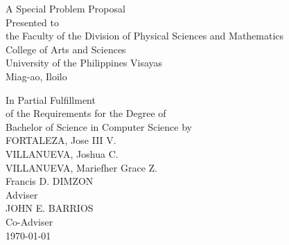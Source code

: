 \begin{titlepage}
\centering


\vspace{1cm}
A Special Problem Proposal\\
Presented to\\
the Faculty of the Division of Physical Sciences and Mathematics\\
College of Arts and Sciences\\
University of the Philippines Visayas\\
Miag-ao, Iloilo

\vspace{1cm}
In Partial Fulfillment\\
of the Requirements for the Degree of\\
Bachelor of Science in Computer Science
\vspace{1cm}
by\\

\vspace{1cm}
FORTALEZA, Jose III V. \\
VILLANUEVA, Joshua C.  \\
VILLANUEVA, Mariefher Grace Z.  \\

\vspace{1cm}
Francis D. DIMZON \\
Adviser\\

\vspace{1cm}
JOHN E. BARRIOS \\
Co-Adviser\\

\vspace{1.75cm}
\today
\end{titlepage}